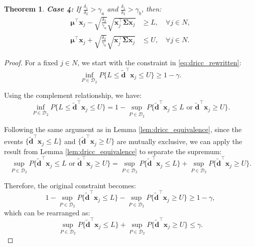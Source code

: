 \documentclass[preprint,12pt,authoryear]{elsarticle}
\newtheorem{theorem}{Theorem}
\begin{document}
\begin{theorem}
\textbf{Case 4:} If $\frac{\delta_1}{\delta_2} > \gamma_a$ and $\frac{\delta_1}{\delta_2} > \gamma_b$, then:
\begin{align}
\boldsymbol{\mu}^\top \mathbf{x}_j - \sqrt{\frac{\delta_2}{\gamma_a}} \sqrt{\mathbf{x}_j^\top \boldsymbol{\Sigma} \mathbf{x}_j} &\geqslant L, \quad \forall j \in N, \label{eq:dricc_d2_adm_case4_lower} \\
\boldsymbol{\mu}^\top \mathbf{x}_j + \sqrt{\frac{\delta_2}{\gamma_b}} \sqrt{\mathbf{x}_j^\top \boldsymbol{\Sigma} \mathbf{x}_j} &\leqslant U, \quad \forall j \in N. \label{eq:dricc_d2_adm_case4_upper}
\end{align}
\end{theorem}

\begin{proof}
For a fixed $j \in N$, we start with the constraint in \eqref{eq:dricc_rewritten}:
\begin{equation*}
\inf_{P \in \mathcal{D}_2} P \{L \leqslant \widetilde{\mathbf{d}}^\top \mathbf{x}_j \leqslant U \} \geqslant 1 - \gamma.
\end{equation*}

Using the complement relationship, we have:
\begin{equation*}
\inf_{P \in \mathcal{D}_2} P \{L \leqslant \widetilde{\mathbf{d}}^\top \mathbf{x}_j \leqslant U \} = 1 - \sup_{P \in \mathcal{D}_2} P \{\widetilde{\mathbf{d}}^\top \mathbf{x}_j \leqslant L \text{ or } \widetilde{\mathbf{d}}^\top \mathbf{x}_j \geqslant U \}.
\end{equation*}

Following the same argument as in Lemma \ref{lem:dricc_equivalence}, since the events $\{\widetilde{\mathbf{d}}^\top \mathbf{x}_j \leqslant L\}$ and $\{\widetilde{\mathbf{d}}^\top \mathbf{x}_j \geqslant U\}$ are mutually exclusive, we can apply the result from Lemma \ref{lem:dricc_equivalence} to separate the supremum:
\begin{equation*}
\sup_{P \in \mathcal{D}_2} P \{\widetilde{\mathbf{d}}^\top \mathbf{x}_j \leqslant L \text{ or } \widetilde{\mathbf{d}}^\top \mathbf{x}_j \geqslant U \} = \sup_{P \in \mathcal{D}_2} P \{\widetilde{\mathbf{d}}^\top \mathbf{x}_j \leqslant L\} + \sup_{P \in \mathcal{D}_2} P \{\widetilde{\mathbf{d}}^\top \mathbf{x}_j \geqslant U\}.
\end{equation*}

Therefore, the original constraint becomes:
\begin{equation*}
1 - \sup_{P \in \mathcal{D}_2} P \{\widetilde{\mathbf{d}}^\top \mathbf{x}_j \leqslant L\} - \sup_{P \in \mathcal{D}_2} P \{\widetilde{\mathbf{d}}^\top \mathbf{x}_j \geqslant U\} \geqslant 1 - \gamma,
\end{equation*}
which can be rearranged as:
\begin{equation}
\sup_{P \in \mathcal{D}_2} P \{\widetilde{\mathbf{d}}^\top \mathbf{x}_j \leqslant L\} + \sup_{P \in \mathcal{D}_2} P \{\widetilde{\mathbf{d}}^\top \mathbf{x}_j \geqslant U\} \leqslant \gamma.
\label{eq:dricc_d2_sup}
\end{equation}


\end{proof}
\end{document}
